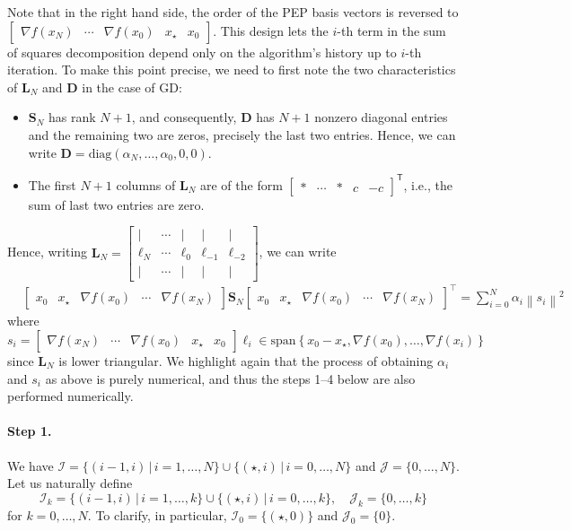 \documentclass{article}
\theoremstyle{definition}
\theoremstyle{plain}
\newcommand{\vD}{{\mathbf{D}}}
\newcommand{\vL}{{\mathbf{L}}}
\newcommand{\vS}{{\mathbf{S}}}
\newcommand{\cI}{{\mathcal{I}}}
\newcommand{\cJ}{{\mathcal{J}}}
\newcommand{\sqnorm}[1]{\left\| #1 \right\|^2}
\newcommand{\set}[1]{\left\{ #1 \right\}}
\newcommand{\transpose}{\mathsf{T}}
\newcommand{\bmat}[1]{\begin{bmatrix} #1 \end{bmatrix}}
\begin{document}
Note that in the right hand side, the order of the PEP basis vectors is reversed to $\begin{bmatrix} \nabla f(x_N) & \cdots & \nabla f(x_0) & x_\star & x_0 \end{bmatrix}$.
This design lets the $i$-th term in the sum of squares decomposition depend only on the algorithm's history up to $i$-th iteration.
To make this point precise, we need to first note the two characteristics of $\vL_N$ and $\vD$ in the case of GD:
\begin{itemize}
    \item[(i)] $\vS_N$ has rank $N+1$, and consequently, $\vD$ has $N+1$ nonzero diagonal entries and the remaining two are zeros, precisely the last two entries.
    Hence, we can write $\vD = \mathrm{diag}(\alpha_N, \dots, \alpha_0, 0, 0)$.
    \item[(ii)] The first $N+1$ columns of $\vL_N$ are of the form $\bmat{* & \cdots & * & c & -c}^\transpose$, i.e., the sum of last two entries are zero.
\end{itemize}
Hence, writing $\vL_N = \begin{bmatrix} \mid & \cdots & \mid & \mid & \mid  \\ \boldsymbol{\ell}_N & \cdots & \boldsymbol{\ell}_0 & \boldsymbol{\ell}_{-1} & \boldsymbol{\ell}_{-2} \\ \mid & \cdots & \mid & \mid & \mid \end{bmatrix}$, we can write
\begin{align*}
    & \begin{bmatrix} x_0 & x_\star & \nabla f(x_0) & \cdots & \nabla f(x_N) \end{bmatrix} \vS_N \begin{bmatrix} x_0 & x_\star & \nabla f(x_0) & \cdots & \nabla f(x_N) \end{bmatrix}^{\intercal} = \sum_{i=0}^N \alpha_i \sqnorm{s_i}
\end{align*}
where $s_i = \begin{bmatrix} \nabla f(x_N) & \cdots & \nabla f(x_0) & x_\star & x_0 \end{bmatrix} \boldsymbol{\ell}_{i} \in \text{span}\set{x_0-x_\star, \nabla f(x_0), \dots, \nabla f(x_{i})}$ since $\vL_N$ is lower triangular.
We highlight again that the process of obtaining $\alpha_i$ and $s_i$ as above is purely numerical, and thus the steps 1--4 below are also performed numerically.




\paragraph{Step 1.} We have $\cI = \{(i-1,i)\,|\,i=1,\dots,N\} \cup \{(\star,i)\,|\,i=0,\dots,N\}$ and $\cJ = \{0,\dots,N\}$.
Let us naturally define 
\[
    \cI_k = \{(i-1,i)\,|\,i=1,\dots,k\} \cup \{(\star,i)\,|\,i=0,\dots,k\} , \quad \cJ_k = \{0,\dots,k\}
\]
for $k=0,\dots,N$. To clarify, in particular, $\cI_0 = \{(\star,0)\}$ and $\cJ_0 = \{0\}$.
\end{document}
